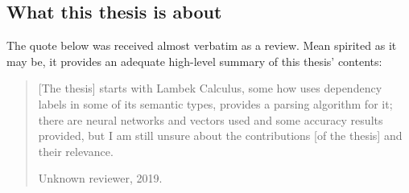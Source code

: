 {\subsection*{What this thesis is about}
The quote below was received almost verbatim as a review.
Mean spirited as it may be, it provides an adequate high-level summary of this thesis' contents: 
\begin{quote}
[The thesis] starts with Lambek Calculus, some how uses dependency labels in some of its semantic types, provides a parsing algorithm for it; there are neural networks and vectors used and some accuracy results provided, but I am still unsure about the contributions [of the thesis] and their relevance.
\begin{flushright} Unknown reviewer, 2019.\end{flushright}
\end{quote}

}
